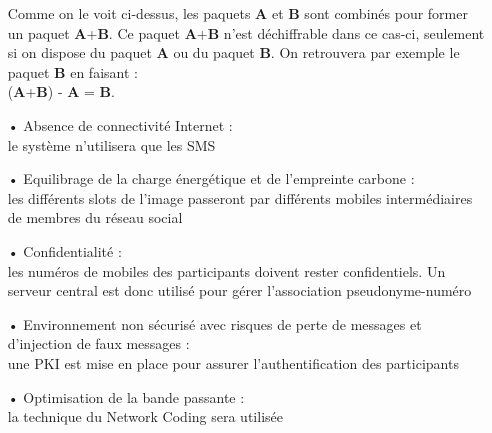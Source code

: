 \begin{itemize}
            Comme on le voit ci-dessus, les paquets \textbf{A} et \textbf{B} sont combinés pour former un paquet \textbf{A}+\textbf{B}. Ce paquet \textbf{A}+\textbf{B} n'est déchiffrable dans ce cas-ci, seulement si on dispose du paquet \textbf{A} ou du paquet \textbf{B}.
            On retrouvera par exemple le paquet \textbf{B} en faisant : \\ (\textbf{A}+\textbf{B}) - \textbf{A} = \textbf{B}.
            \\
            
    \item [•] Absence de connectivité Internet :
    \\
    le système n'utilisera que les SMS
    \\
    
    \item [•] Equilibrage de la charge énergétique et de l'empreinte carbone :
    \\
    les différents slots de l'image passeront par différents mobiles intermédiaires
    de membres du réseau social
    \\
    
    \item [•]  Confidentialité :
    \\
     les numéros de mobiles des participants doivent rester confidentiels.
     Un serveur central est donc utilisé pour gérer l'association
     pseudonyme-numéro
     \\
     \item [•] Environnement non sécurisé avec risques de perte de messages
        et d'injection de faux messages :
        \\
        une PKI est mise en place pour assurer l'authentification des participants
     \\
     
     \item [•] Optimisation de la bande passante :
     \\
    la technique du Network Coding sera utilisée

\end{itemize}
